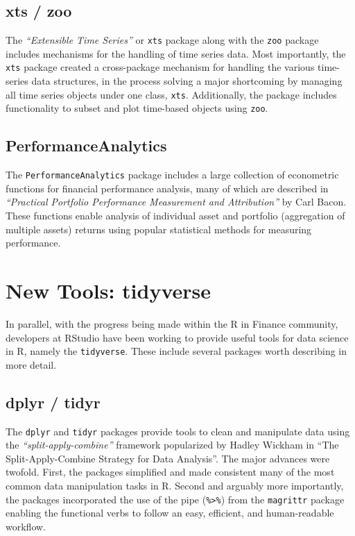 \subsection{xts / zoo}\label{xts-zoo}

The \emph{``Extensible Time Series''} or \texttt{xts} package along with
the \texttt{zoo} package includes mechanisms for the handling of time
series data. Most importantly, the \texttt{xts} package created a
cross-package mechanism for handling the various time-series data
structures, in the process solving a major shortcoming by managing all
time series objects under one class, \texttt{xts}. Additionally, the
package includes functionality to subset and plot time-based objects
using \texttt{zoo}.

\subsection{PerformanceAnalytics}\label{performanceanalytics}

The \texttt{PerformanceAnalytics} package includes a large collection of
econometric functions for financial performance analysis, many of which
are described in \emph{``Practical Portfolio Performance Measurement and
Attribution''} by Carl Bacon. These functions enable analysis of
individual asset and portfolio (aggregation of multiple assets) returns
using popular statistical methods for measuring performance.

\section{New Tools: tidyverse}\label{new-tools-tidyverse}

In parallel, with the progress being made within the R in Finance
community, developers at RStudio have been working to provide useful
tools for data science in R, namely the \texttt{tidyverse}. These
include several packages worth describing in more detail.

\subsection{dplyr / tidyr}\label{dplyr-tidyr}

The \texttt{dplyr} and \texttt{tidyr} packages provide tools to clean
and manipulate data using the \emph{``split-apply-combine''} framework
popularized by Hadley Wickham in ``The Split-Apply-Combine Strategy for
Data Analysis''. The major advances were twofold. First, the packages
simplified and made consistent many of the most common data manipulation
tasks in R. Second and arguably more importantly, the packages
incorporated the use of the pipe (\texttt{\%\textgreater{}\%}) from the
\texttt{magrittr} package enabling the functional verbs to follow an
easy, efficient, and human-readable workflow.

